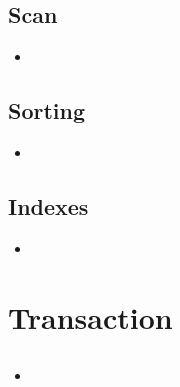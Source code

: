 \documentclass[10pt]{article}
\begin{document}
\subsection{Scan}
	\begin{itemize}
	\item
	\end{itemize}

\subsection{Sorting}
	\begin{itemize}
	\item
	\end{itemize}

\subsection{Indexes}
	\begin{itemize}
	\item
	\end{itemize}
\section{Transaction}
	\subsection{}
	\begin{itemize}
	\item
	\end{itemize}
\end{document}
